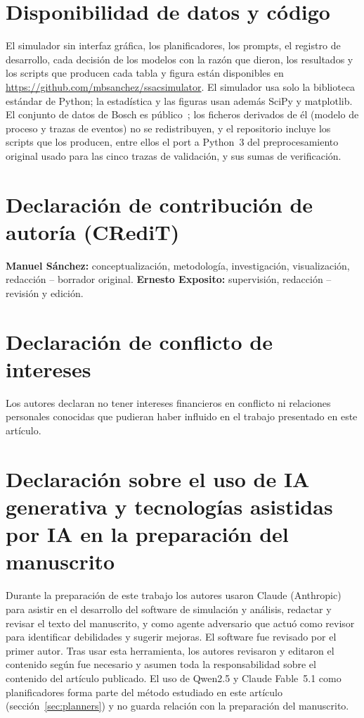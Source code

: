 \documentclass[preprint,11pt]{elsarticle}
\begin{document}
\section*{Disponibilidad de datos y código}
\label{sec:availability}
El simulador sin interfaz gráfica, los planificadores, los prompts, el registro de desarrollo, cada decisión de los modelos con la razón que dieron, los resultados y los scripts que producen cada tabla y figura están disponibles en \url{https://github.com/mbsanchez/ssacsimulator}. El simulador usa solo la biblioteca estándar de Python; la estadística y las figuras usan además SciPy y matplotlib. El conjunto de datos de Bosch es público~\cite{bosch2016kaggle}; los ficheros derivados de él (modelo de proceso y trazas de eventos) no se redistribuyen, y el repositorio incluye los scripts que los producen, entre ellos el port a Python~3 del preprocesamiento original usado para las cinco trazas de validación, y sus sumas de verificación.

\section*{Declaración de contribución de autoría (CRediT)}
\textbf{Manuel S\'anchez:} conceptualización, metodología, investigación, visualización, redacción -- borrador original. \textbf{Ernesto Exposito:} supervisión, redacción -- revisión y edición.

\section*{Declaración de conflicto de intereses}
Los autores declaran no tener intereses financieros en conflicto ni relaciones personales conocidas que pudieran haber influido en el trabajo presentado en este artículo.

\section*{Declaración sobre el uso de IA generativa y tecnologías asistidas por IA en la preparación del manuscrito}
Durante la preparación de este trabajo los autores usaron Claude (Anthropic) para asistir en el desarrollo del software de simulación y análisis, redactar y revisar el texto del manuscrito, y como agente adversario que actuó como revisor para identificar debilidades y sugerir mejoras. El software fue revisado por el primer autor. Tras usar esta herramienta, los autores revisaron y editaron el contenido según fue necesario y asumen toda la responsabilidad sobre el contenido del artículo publicado. El uso de Qwen2.5 y Claude Fable~5.1 como planificadores forma parte del método estudiado en este artículo (sección~\ref{sec:planners}) y no guarda relación con la preparación del manuscrito.



\end{document}
